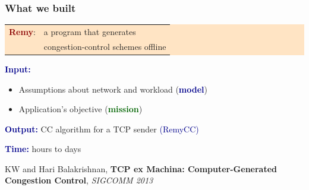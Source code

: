 \documentclass[svgnames]{beamer}
\newcommand{\ssline}{\vspace{8 pt}}
\begin{document}
\begin{frame}
\frametitle{What we built}

\colorbox{Bisque}{
\begin{centering}
\noindent \begin{tabular}{ll}
\Large \textcolor{DarkRed}{\bf Remy}: & \Large a program that generates \\ & \Large congestion-control schemes offline
\end{tabular}

\end{centering}}

\ssline
\ssline

\textcolor{DarkBlue}{\bf Input:}

\begin{itemize}
\item Assumptions about network and workload (\textbf{\textcolor{DarkBlue}{model}})

\item Application's objective (\textbf{\textcolor{DarkGreen}{mission}})
\end{itemize}

\textcolor{DarkBlue}{\bf Output:} CC algorithm for a TCP sender \hspace{0.177 cm}\textcolor{DarkBlue}{(RemyCC)}

\ssline

\textcolor{DarkBlue}{\bf Time:} hours to days

\vspace{\baselineskip}
\vspace{\baselineskip}
\vspace{\baselineskip}

\scriptsize

KW and Hari Balakrishnan, \textbf{TCP ex Machina: Computer-Generated Congestion Control}, \textit{SIGCOMM 2013}

\end{frame}

%
%
%
%
%
%
\end{document}
